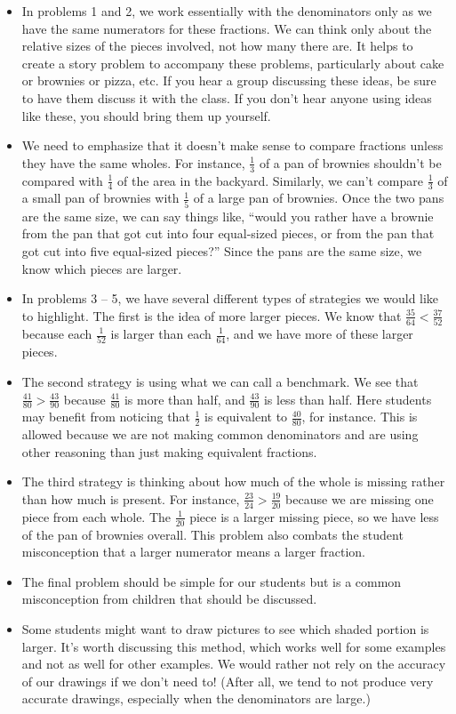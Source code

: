 \documentclass[nooutcomes,noauthor]{ximera}
\begin{document}
\begin{instructorNotes}
\begin{itemize}
	\item In problems 1 and 2, we work essentially with the denominators only as we have the same numerators for these fractions. We can think only about the relative sizes of the pieces involved, not how many there are. It helps to create a story problem to accompany these problems, particularly about cake or brownies or pizza, etc. If you hear a group discussing these ideas, be sure to have them discuss it with the class. If you don't hear anyone using ideas like these, you should bring them up yourself.
	\item We need to emphasize that it doesn't make sense to compare fractions unless they have the same wholes. For instance, $\frac13$ of a pan of brownies shouldn't be compared with $\frac14$ of the area in the backyard. Similarly, we can't compare $\frac13$ of a small pan of brownies with $\frac15$ of a large pan of brownies. Once the two pans are the same size, we can say things like, ``would you rather have a brownie from the pan that got cut into four equal-sized pieces, or from the pan that got cut into five equal-sized pieces?'' Since the pans are the same size, we know which pieces are larger.
	\item In problems 3 -- 5, we have several different types of strategies we would like to highlight. The first is the idea of more larger pieces. We know that $\frac{35}{64} < \frac{37}{52}$ because each $\frac{1}{52}$ is larger than each $\frac{1}{64}$, and we have more of these larger pieces.
	\item The second strategy is using what we can call a benchmark. We see that $\frac{41}{80} > \frac{43}{90}$ because $\frac{41}{80}$ is more than half, and $\frac{43}{90}$ is less than half. Here students may benefit from noticing that $\frac{1}{2}$ is equivalent to $\frac{40}{80}$, for instance. This is allowed because we are not making common denominators and are using other reasoning than just making equivalent fractions.
	\item The third strategy is thinking about how much of the whole is missing rather than how much is present. For instance, $\frac{23}{24}>\frac{19}{20}$ because we are missing one piece from each whole. The $\frac{1}{20}$ piece is a larger missing piece, so we have less of the pan of brownies overall. This problem also combats the student misconception that a larger numerator means a larger fraction.
	\item The final problem should be simple for our students but is a common misconception from children that should be discussed.
	\item Some students might want to draw pictures to see which shaded portion is larger. It's worth discussing this method, which works well for some examples and not as well for other examples. We would rather not rely on the accuracy of our drawings if we don't need to! (After all, we tend to not produce very accurate drawings, especially when the denominators are large.)
\end{itemize}





\end{instructorNotes}
\end{document}
